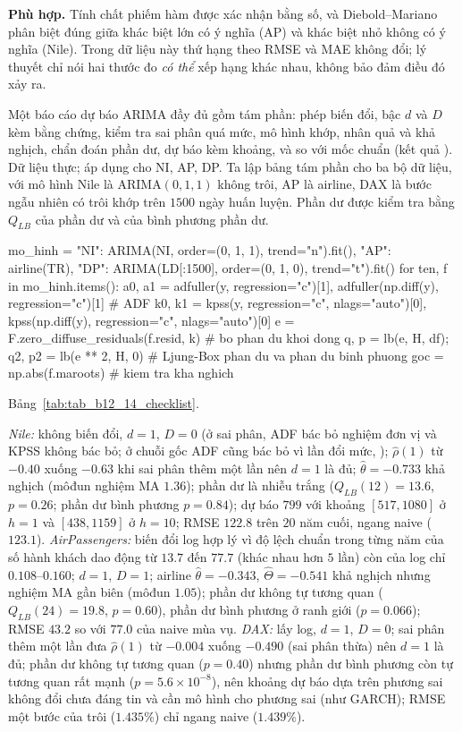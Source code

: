  \textbf{Phù hợp.} Tính chất phiếm hàm được xác nhận bằng số, và Diebold--Mariano phân biệt đúng giữa khác biệt lớn có ý nghĩa (AP) và khác biệt nhỏ không có ý nghĩa (Nile). Trong dữ liệu này thứ hạng theo RMSE và MAE không đổi; lý thuyết chỉ nói hai thước đo \emph{có thể} xếp hạng khác nhau, không bảo đảm điều đó xảy ra.

 Một báo cáo dự báo ARIMA đầy đủ gồm tám phần: phép biến đổi, bậc $d$ và $D$ kèm bằng chứng, kiểm tra sai phân quá mức, mô hình khớp, nhân quả và khả nghịch, chẩn đoán phần dư, dự báo kèm khoảng, và so với mốc chuẩn (kết quả ).
 Dữ liệu thực; áp dụng cho NI, AP, DP. Ta lập bảng tám phần cho ba bộ dữ liệu, với mô hình Nile là ARIMA$(0,1,1)$ không trôi, AP là airline, DAX là bước ngẫu nhiên có trôi khớp trên $1500$ ngày huấn luyện. Phần dư được kiểm tra bằng $Q_{LB}$ của phần dư và của bình phương phần dư.
\begin{codeblock}
mo_hinh = {"NI": ARIMA(NI, order=(0, 1, 1), trend="n").fit(), "AP": airline(TR),
           "DP": ARIMA(LD[:1500], order=(0, 1, 0), trend="t").fit()}
for ten, f in mo_hinh.items():
    a0, a1 = adfuller(y, regression="c")[1], adfuller(np.diff(y), regression="c")[1]   # ADF
    k0, k1 = kpss(y, regression="c", nlags="auto")[0], kpss(np.diff(y), regression="c", nlags="auto")[0]
    e = F.zero_diffuse_residuals(f.resid, k)        # bo phan du khoi dong
    q, p = lb(e, H, df); q2, p2 = lb(e ** 2, H, 0)  # Ljung-Box phan du va phan du binh phuong
    goc = np.abs(f.maroots)                          # kiem tra kha nghich
\end{codeblock}
 Bảng~\ref{tab:tab_b12_14_checklist}.

 \emph{Nile:} không biến đổi, $d=1$, $D=0$ (ở sai phân, ADF bác bỏ nghiệm đơn vị và KPSS không bác bỏ; ở chuỗi gốc ADF cũng bác bỏ vì lần đổi mức, ); $\hat\rho(1)$ từ $-0.40$ xuống $-0.63$ khi sai phân thêm một lần nên $d=1$ là đủ; $\hat\theta=-0.733$ khả nghịch (môđun nghiệm MA $1.36$); phần dư là nhiễu trắng ($Q_{LB}(12)=13.6$, $p=0.26$; phần dư bình phương $p=0.84$); dự báo $799$ với khoảng $[517,1080]$ ở $h=1$ và $[438,1159]$ ở $h=10$; RMSE $122.8$ trên $20$ năm cuối, ngang naive ($123.1$). \emph{AirPassengers:} biến đổi log hợp lý vì độ lệch chuẩn trong từng năm của số hành khách dao động từ $13.7$ đến $77.7$ (khác nhau hơn $5$ lần) còn của log chỉ $0.108$--$0.160$; $d=1$, $D=1$; airline $\hat\theta=-0.343$, $\hat\Theta=-0.541$ khả nghịch nhưng nghiệm MA gần biên (môđun $1.05$); phần dư không tự tương quan ($Q_{LB}(24)=19.8$, $p=0.60$), phần dư bình phương ở ranh giới ($p=0.066$); RMSE $43.2$ so với $77.0$ của naive mùa vụ. \emph{DAX:} lấy log, $d=1$, $D=0$; sai phân thêm một lần đưa $\hat\rho(1)$ từ $-0.004$ xuống $-0.490$ (sai phân thừa) nên $d=1$ là đủ; phần dư không tự tương quan ($p=0.40$) nhưng phần dư bình phương còn tự tương quan rất mạnh ($p=5.6\times10^{-8}$), nên khoảng dự báo dựa trên phương sai không đổi chưa đáng tin và cần mô hình cho phương sai (như GARCH); RMSE một bước của trôi ($1.435\%$) chỉ ngang naive ($1.439\%$).

